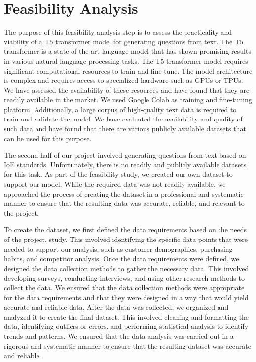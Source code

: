 \documentclass[12pt]{report}
\begin{document}
\section{Feasibility Analysis}
The purpose of this feasibility analysis step is to assess the practicality and viability of a T5 transformer model for generating questions from text. The T5 transformer is a state-of-the-art language model that has shown promising results in various natural language processing tasks.  
The T5 transformer model requires significant computational resources to train and fine-tune. The model architecture is complex and requires access to specialized hardware such as GPUs or TPUs. We have assessed the availability of these resources and have found that they are readily available in the market. We used Google Colab as training and fine-tuning platform. Additionally, a large corpus of high-quality text data is required to train and validate the model. We have evaluated the availability and quality of such data and have found that there are various publicly available datasets that can be used for this purpose.

The second half of our project involved generating questions from text based on IoE standards. Unfortunately, there is no readily and publicly available datasets for this task. As part of the feasibility study, we created our own dataset to support our model. While the required data was not readily available, we approached the process of creating the dataset in a professional and systematic manner to ensure that the resulting data was accurate, reliable, and relevant to the project.

To create the dataset, we first defined the data requirements based on the needs of the project. study. This involved identifying the specific data points that were needed to support our analysis, such as customer demographics, purchasing habits, and competitor analysis.
Once the data requirements were defined, we designed the data collection methods to gather the necessary data. This involved developing surveys, conducting interviews, and using other research methods to collect the data. We ensured that the data collection methods were appropriate for the data requirements and that they were designed in a way that would yield accurate and reliable data.
After the data was collected, we organized and analyzed it to create the final dataset. This involved cleaning and formatting the data, identifying outliers or errors, and performing statistical analysis to identify trends and patterns. We ensured that the data analysis was carried out in a rigorous and systematic manner to ensure that the resulting dataset was accurate and reliable.
\end{document}
